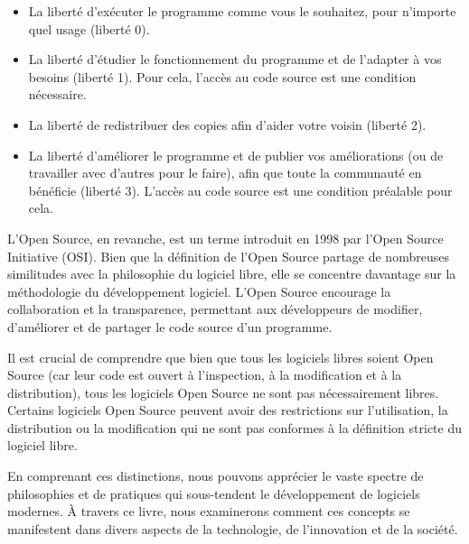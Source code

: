 \begin{itemize}
\item La liberté d'exécuter le programme comme vous le souhaitez, pour n'importe quel usage (liberté 0).
\item La liberté d'étudier le fonctionnement du programme et de l'adapter à vos besoins (liberté 1). Pour cela, l'accès au code source est une condition nécessaire.
\item La liberté de redistribuer des copies afin d'aider votre voisin (liberté 2).
\item La liberté d'améliorer le programme et de publier vos améliorations (ou de travailler avec d'autres pour le faire), afin que toute la communauté en bénéficie (liberté 3). L'accès au code source est une condition préalable pour cela.
\end{itemize}

L'Open Source, en revanche, est un terme introduit en 1998 par l'Open Source Initiative (OSI)\cite{FSF,OSI}. Bien que la définition de l'Open Source partage de nombreuses similitudes avec la philosophie du logiciel libre, elle se concentre davantage sur la méthodologie du développement logiciel. L'Open Source encourage la collaboration et la transparence, permettant aux développeurs de modifier, d'améliorer et de partager le code source d'un programme.

Il est crucial de comprendre que bien que tous les logiciels libres soient Open Source (car leur code est ouvert à l'inspection, à la modification et à la distribution), tous les logiciels Open Source ne sont pas nécessairement libres. Certains logiciels Open Source peuvent avoir des restrictions sur l'utilisation, la distribution ou la modification qui ne sont pas conformes à la définition stricte du logiciel libre.

En comprenant ces distinctions, nous pouvons apprécier le vaste spectre de philosophies et de pratiques qui sous-tendent le développement de logiciels modernes. À travers ce livre, nous examinerons comment ces concepts se manifestent dans divers aspects de la technologie, de l'innovation et de la société.

